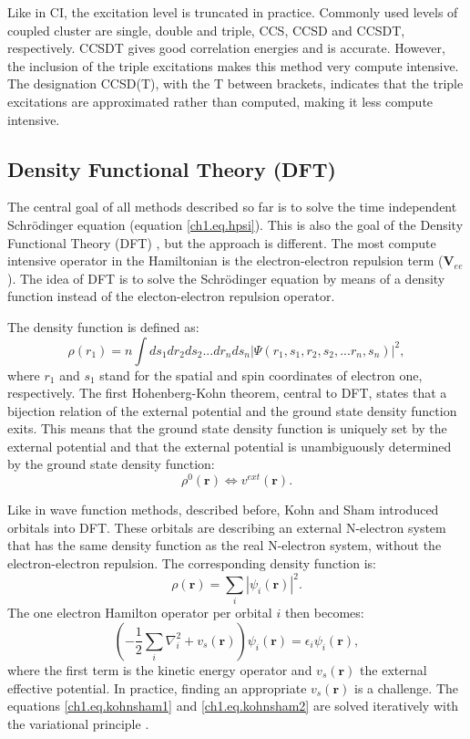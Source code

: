 Like in CI, the excitation level is truncated in practice. Commonly used levels of coupled cluster are single, double and triple, CCS, CCSD and CCSDT, respectively. CCSDT gives good correlation energies and is accurate. However, the inclusion of the triple excitations makes this method very compute intensive. The designation CCSD(T), with the T between brackets, indicates that the triple excitations are approximated rather than computed, making it less compute intensive.

\subsection{Density Functional Theory (DFT)}
The central goal of all methods described so far is to solve the time independent Schr\"{o}dinger equation (equation \ref{ch1.eq.hpsi}). This is also the goal of the Density Functional Theory (DFT) \cite{jensen, hohenberg, kohnsham}, but the approach is different. The most compute intensive operator in the Hamiltonian is the electron-electron repulsion term ($\mathbf{V}_{ee}$). The idea of DFT is to solve the Schr\"{o}dinger equation by means of a density function instead of the electon-electron repulsion operator.

The density function is defined as:
\begin{equation}
\rho(r_1)=n \int ds_1dr_2ds_2 ... dr_nds_n | \Psi(r_1,s_1,r_2,s_2, ... r_n,s_n)|^2,
\end{equation}
where $r_1$ and $s_1$ stand for the spatial and spin coordinates of electron one, respectively. The first Hohenberg-Kohn theorem, central to DFT, states that a bijection relation of the external potential and the ground state density function exits. This means that the ground state density function is uniquely set by the external potential and
that the external potential is unambiguously determined by the ground state density function:
\begin{equation}
\rho^0(\mathbf{r}) \Leftrightarrow v^{ext}(\mathbf{r}).
\end{equation}

Like in wave function methods, described before, Kohn and Sham introduced orbitals into DFT. These orbitals are describing an external N-electron system that has the same density function as the real N-electron system, without the electron-electron repulsion. The corresponding density function is:
\begin{equation}
\rho(\mathbf{r}) = \sum_i | \psi_i(\mathbf{r})|^2.
\label{ch1.eq.kohnsham1}
\end{equation}
The one electron Hamilton operator per orbital $i$ then becomes:
\begin{equation}
\left( -\frac{1}{2} \sum_i \nabla^2_i + v_s (\mathbf{r}) \right) \psi_i(\mathbf{r}) = \epsilon_i\psi_i(\mathbf{r}),
\label{ch1.eq.kohnsham2}
\end{equation}
where the first term is the kinetic energy operator and $v_s(\mathbf{r})$ the external effective potential. In practice, finding an appropriate $v_s(\mathbf{r})$ is a challenge. The equations \ref{ch1.eq.kohnsham1} and \ref{ch1.eq.kohnsham2} are solved iteratively with the variational principle \cite{varia}.

